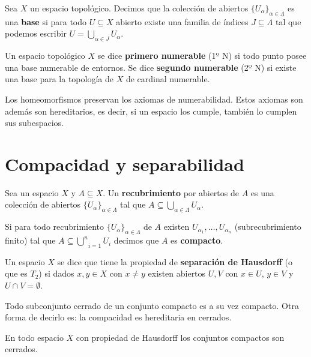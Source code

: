 \documentclass[GTS.tex]{subfiles}
\begin{document}
\begin{defi} Sea $X$ un espacio topológico. Decimos que la colección de abiertos $\{U_\alpha\}_{\alpha\in\Lambda}$ es una \textbf{base} si para todo $U\subseteq X$ abierto existe una familia de índices $J\subseteq\Lambda$ tal que podemos escribir $U=\bigcup_{\alpha\in J}U_\alpha$.
\end{defi}

\begin{defi}
Un espacio topológico $X$ se dice \textbf{primero numerable} (1º N) si todo punto posee una base numerable de entornos. Se dice \textbf{segundo numerable} (2º N) si existe una base para la topología de $X$ de cardinal numerable.
\end{defi}

\begin{prop}
Los homeomorfismos preservan los axiomas de numerabilidad. Estos axiomas son además son hereditarios, es decir, si un espacio los cumple, también lo cumplen sus subespacios.
\end{prop}

\section{Compacidad y separabilidad}
\begin{defi}Sea un espacio $X$ y $A\subseteq X$. Un \textbf{recubrimiento} por abiertos de $A$ es una colección de abiertos $\{U_\alpha\}_{\alpha\in\Lambda}$ tal que $A\subseteq\underset{\alpha\in\Lambda}{\bigcup}U_\alpha$.
\end{defi}
\begin{defi} Si para todo recubrimiento $\{U_\alpha\}_{\alpha\in\Lambda}$ de $A$ existen $U_{\alpha_1},\dots,U_{\alpha_n}$ (subrecubrimiento finito) tal que $A\subseteq\underset{i=1}{\overset{n}{\bigcup}}U_i$ decimos que $A$ es \textbf{compacto}.
\end{defi}
\begin{defi} Un espacio $X$ se dice que tiene la propiedad de \textbf{separación de Hausdorff} (o que es $T_2$) si dados $x,y\in X$ con $x\neq y$ existen abiertos $U,V$ con $x\in U$, $y\in V$ y $U\cap V=\emptyset$.
\end{defi}
\begin{prop} Todo subconjunto cerrado de un conjunto compacto es a su vez compacto. Otra forma de decirlo es: la compacidad es hereditaria en cerrados.
\end{prop}
\begin{prop} En todo espacio $X$ con propiedad de Hausdorff los conjuntos compactos son cerrados.
\end{prop}
\end{document}
